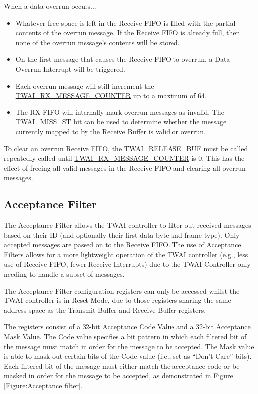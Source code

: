 \documentclass[main\_\_EN.tex]{subfiles}
\begin{document}
When a data overrun occurs...
\begin{itemize}
    \item Whatever free space is left in the Receive FIFO is filled with the partial contents of the overrun message. If the Receive FIFO is already full, then none of the overrun message’s contents will be stored.
    \item On the first message that causes the Receive FIFO to overrun, a Data Overrun Interrupt will be triggered.
    \item Each overrun message will still increment the  \hyperref[fielddesc:TWAIRXMESSAGECOUNTER]{TWAI\_RX\_MESSAGE\_COUNTER} up to a maximum of 64.
    \item The RX FIFO will internally mark overrun messages as invalid. The \hyperref[fielddesc:TWAIMISSST]{TWAI\_MISS\_ST} bit can be used to determine whether the message currently mapped to by the Receive Buffer is valid or overrun.
\end{itemize}

To clear an overrun Receive FIFO, the \hyperref[fielddesc:TWAIRELEASEBUF]{TWAI\_RELEASE\_BUF} must be called repeatedly called until \hyperref[fielddesc:TWAIRXMESSAGECOUNTER]{TWAI\_RX\_MESSAGE\_COUNTER} is 0. This has the effect of freeing all valid messages in the Receive FIFO and clearing all overrun messages.

\subsection{Acceptance Filter}

The Acceptance Filter allows the TWAI controller to filter out received messages based on their ID (and optionally their first data byte and frame type). Only accepted messages are passed on to the Receive FIFO. The use of Acceptance Filters allows for a more lightweight operation of the TWAI controller (e.g., less use of Receive FIFO, fewer Receive Interrupts) due to the TWAI Controller only needing to handle a subset of messages.

The Acceptance Filter configuration registers can only be accessed whilst the TWAI controller is in Reset Mode, due to those registers sharing the same address space as the Transmit Buffer and Receive Buffer registers.

The registers consist of a 32-bit Acceptance Code Value and a 32-bit Acceptance Mask Value. The Code value specifies a bit pattern in which each filtered bit of the message must match in order for the message to be accepted. The Mask value is able to mask out certain bits of the Code value (i.e., set as “Don’t Care” bits). Each filtered bit of the message must either match the acceptance code or be masked in order for the message to be accepted, as demonstrated in Figure \ref{Figure:Acceptance filter}.
\end{document}
